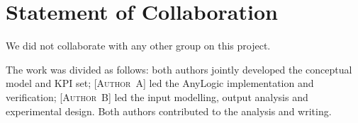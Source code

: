 \section{Statement of Collaboration}
\label{sec:collab}

We did not collaborate with any other group on this project.

The work was divided as follows: %
both authors jointly developed the conceptual model and KPI set;
\textsc{[Author~A]} led the AnyLogic implementation and verification;
\textsc{[Author~B]} led the input modelling, output analysis and experimental
design. Both authors contributed to the analysis and writing.
